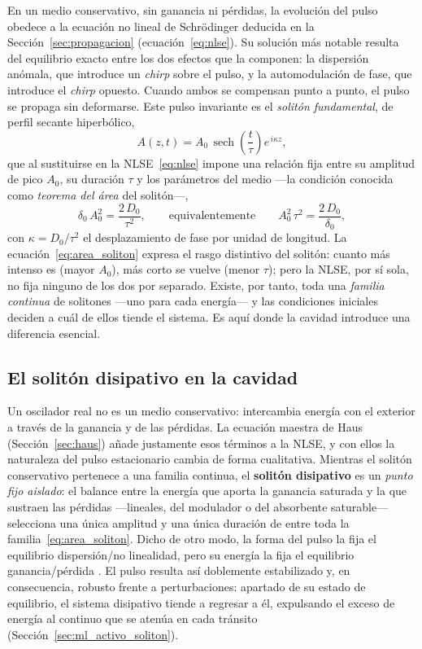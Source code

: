 En un medio conservativo, sin ganancia ni pérdidas, la evolución del pulso obedece
a la ecuación no lineal de Schrödinger deducida en la
Sección~\ref{sec:propagacion} (ecuación~\eqref{eq:nlse}). Su solución más notable
resulta del equilibrio exacto entre los dos efectos que la componen: la dispersión
anómala, que introduce un \emph{chirp} sobre el pulso, y la automodulación de fase,
que introduce el \emph{chirp} opuesto. Cuando ambos se compensan punto a punto, el
pulso se propaga sin deformarse. Este pulso invariante es el \emph{solitón
fundamental}, de perfil secante hiperbólico,
%
\begin{equation}
    A(z,t) = A_0\,\operatorname{sech}\!\left(\frac{t}{\tau}\right)
    e^{\,i\kappa z},
    \label{eq:soliton_fundamental}
\end{equation}
%
que al sustituirse en la NLSE~\eqref{eq:nlse} impone una relación fija entre su
amplitud de pico $A_0$, su duración $\tau$ y los parámetros del medio —la condición
conocida como \emph{teorema del área} del solitón—,
%
\begin{equation}
    \delta_0\,A_0^{2} = \frac{2\,D_0}{\tau^{2}},
    \qquad\text{equivalentemente}\qquad
    A_0^{2}\,\tau^{2} = \frac{2\,D_0}{\delta_0},
    \label{eq:area_soliton}
\end{equation}
%
con $\kappa = D_0/\tau^2$ el desplazamiento de fase por unidad de longitud. La
ecuación~\eqref{eq:area_soliton} expresa el rasgo distintivo del solitón: cuanto
más intenso es (mayor $A_0$), más corto se vuelve (menor $\tau$); pero la NLSE, por
sí sola, no fija ninguno de los dos por separado. Existe, por tanto, toda una
\emph{familia continua} de solitones —uno para cada energía— y las condiciones
iniciales deciden a cuál de ellos tiende el sistema. Es aquí donde la cavidad
introduce una diferencia esencial.

\subsection{El solitón disipativo en la cavidad}
\label{sec:soliton_disipativo}

Un oscilador real no es un medio conservativo: intercambia energía con el exterior
a través de la ganancia y de las pérdidas. La ecuación maestra de Haus
(Sección~\ref{sec:haus}) añade justamente esos términos a la NLSE, y con ellos la
naturaleza del pulso estacionario cambia de forma cualitativa. Mientras el solitón
conservativo pertenece a una familia continua, el \textbf{solitón disipativo} es un
\emph{punto fijo aislado}: el balance entre la energía que aporta la ganancia
saturada y la que sustraen las pérdidas —lineales, del modulador o del absorbente
saturable— selecciona una única amplitud y una única duración de entre toda la
familia~\eqref{eq:area_soliton}. Dicho de otro modo, la forma del pulso la fija el
equilibrio dispersión\-/no linealidad, pero su energía la fija el equilibrio
ganancia\-/pérdida \cite{GreluAkhmediev2012}. El pulso resulta así doblemente
estabilizado y, en consecuencia, robusto frente a perturbaciones: apartado de su
estado de equilibrio, el sistema disipativo tiende a regresar a él, expulsando el
exceso de energía al continuo que se atenúa en cada tránsito
(Sección~\ref{sec:ml_activo_soliton}).

